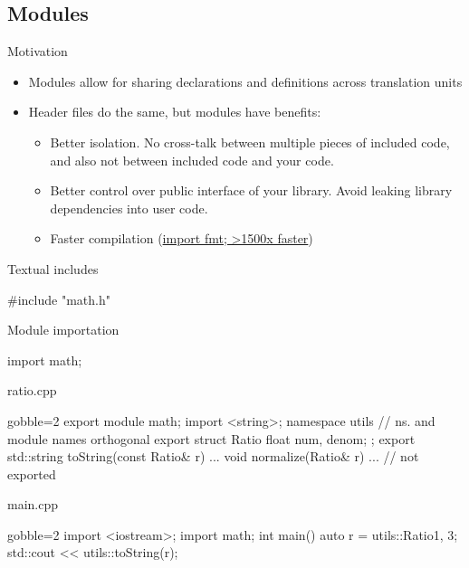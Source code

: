 \subsection[modules]{Modules}

\begin{frame}[fragile]
  \begin{block}{Motivation}
    \begin{itemize}
      \item Modules allow for sharing declarations and definitions across translation units
      \item Header files do the same, but modules have benefits:
      \begin{itemize}
        \item Better isolation. No cross-talk between multiple pieces of included code, and also not between included code and your code.
        \item Better control over public interface of your library. Avoid leaking library dependencies into user code.
        \item Faster compilation (\href{https://youtu.be/DJTEUFRslbI?si=ZRvH1wx0sVJVriLh&t=3259}{import fmt; \textgreater1500x faster})
      \end{itemize}
    \end{itemize}
  \end{block}
  \begin{alertblock}{Textual includes}
    \begin{cppcode}
      #include "math.h"
    \end{cppcode}
  \end{alertblock}
  \begin{exampleblock}{Module importation}
    \begin{cppcode}
      import math;
    \end{cppcode}
  \end{exampleblock}
\end{frame}

\begin{frame}[fragile]
  \begin{exampleblock}{ratio.cpp}
    \begin{cppcode*}{gobble=2}
      export module math;
      import <string>;
      namespace utils { // ns. and module names orthogonal
        export struct Ratio { float num, denom; };
        export std::string toString(const Ratio& r) { ... }
        void normalize(Ratio& r) { ... } // not exported
      }
    \end{cppcode*}
  \end{exampleblock}
  \begin{exampleblock}{main.cpp}
    \begin{cppcode*}{gobble=2}
      import <iostream>;
      import math;
      int main() {
        auto r = utils::Ratio{1, 3};
        std::cout << utils::toString(r);
      }
    \end{cppcode*}
  \end{exampleblock}
\end{frame}

